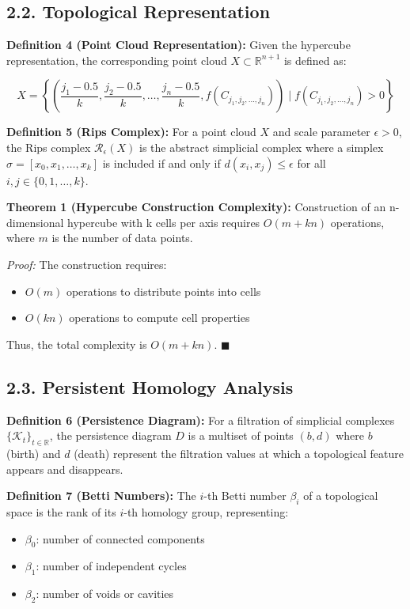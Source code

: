 \documentclass[12pt]{article}
\begin{document}
\subsection*{2.2. Topological Representation}
\textbf{Definition 4 (Point Cloud Representation):} Given the hypercube representation, the corresponding point cloud $X \subset \mathbb{R}^{n+1}$ is defined as:

$$X = \left\{\left(\frac{j_1-0.5}{k}, \frac{j_2-0.5}{k}, \dots, \frac{j_n-0.5}{k}, f(C_{j_1,j_2,\dots,j_n})\right) \mid f(C_{j_1,j_2,\dots,j_n}) > 0\right\}$$

\textbf{Definition 5 (Rips Complex):} For a point cloud $X$ and scale parameter $\epsilon > 0$, the Rips complex $\mathcal{R}_\epsilon(X)$ is the abstract simplicial complex where a simplex $\sigma = [x_0, x_1, \dots, x_k]$ is included if and only if $d(x_i, x_j) \leq \epsilon$ for all $i,j \in \{0,1,\dots,k\}$.

\textbf{Theorem 1 (Hypercube Construction Complexity):} Construction of an n-dimensional hypercube with k cells per axis requires $O(m + kn)$ operations, where $m$ is the number of data points.

\textit{Proof:} The construction requires:

\begin{itemize}
  \item $O(m)$ operations to distribute points into cells
  \item $O(kn)$ operations to compute cell properties
\end{itemize}

Thus, the total complexity is $O(m + kn)$. $\blacksquare$

\subsection*{2.3. Persistent Homology Analysis}
\textbf{Definition 6 (Persistence Diagram):} For a filtration of simplicial complexes $\{\mathcal{K}_t\}_{t \in \mathbb{R}}$, the persistence diagram $D$ is a multiset of points $(b,d)$ where $b$ (birth) and $d$ (death) represent the filtration values at which a topological feature appears and disappears.

\textbf{Definition 7 (Betti Numbers):} The $i$-th Betti number $\beta_i$ of a topological space is the rank of its $i$-th homology group, representing:

\begin{itemize}
  \item $\beta_0$: number of connected components
  \item $\beta_1$: number of independent cycles
  \item $\beta_2$: number of voids or cavities
\end{itemize}
\end{document}
